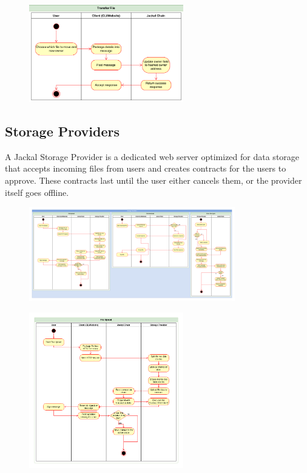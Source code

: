 \documentclass[a4paper]{article}
\begin{document}
\begin{figure}[!htbp]
\centering
\includegraphics[width=0.6\textwidth]{assets/filetree9.png}
\caption{}
\end{figure}

\newpage
\subsection{Storage Providers}
A Jackal Storage Provider is a dedicated web server optimized for data storage that accepts incoming files from users and creates contracts for the users to approve. These contracts last until the user either cancels them, or the provider itself goes offline.

\begin{figure}[!htbp]
\centering
\includegraphics[width=0.8\textwidth]{assets/providers1.png}
\caption{}
\end{figure}

\begin{figure}[!htbp]
\centering
\includegraphics[width=0.6\textwidth]{assets/providers2.png}
\caption{}
\end{figure}
\end{document}
